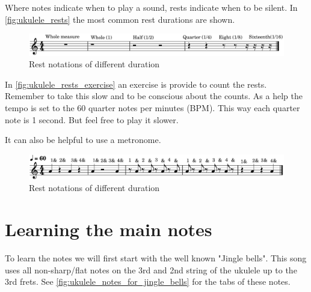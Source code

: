 \newpage

Where notes indicate when to play a sound, rests indicate when to be silent. In \autoref{fig:ukulele_rests} the most common rest durations are shown.

\begin{figure}[h]
	\centering
	\includegraphics[width=\textwidth]{../../MuseScore/Ukulele/UkuleleRests.png}
	\caption{Rest notations of different duration}
	\label{fig:ukulele_rests}
\end{figure}

In \autoref{fig:ukulele_rests_exercise} an exercise is provide to count the rests. Remember to take this slow and to be conscious about the counts. As a help the tempo is set to the 60 quarter notes per minutes (BPM). This way each quarter note is 1 second. But feel free to play it slower.

It can also be helpful to use a metronome.

\begin{figure}[h]
	\centering
	\includegraphics[width=\textwidth]{../../MuseScore/Ukulele/UkuleleRestsExercise.png}
	\caption{Rest notations of different duration}
	\label{fig:ukulele_rests_exercise}
\end{figure}

\newpage

\section{Learning the main notes}

To learn the notes we will first start with the well known "Jingle bells". This song uses all non-sharp/flat notes on the 3rd and 2nd string of the ukulele up to the 3rd frets. See \autoref{fig:ukulele_notes_for_jingle_bells} for the tabs of these notes.

